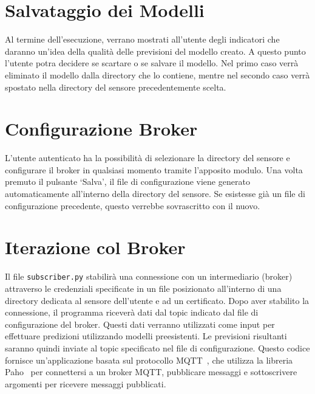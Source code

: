 \documentclass{rapportECL}
\begin{document}
\section{Salvataggio dei Modelli}
Al termine dell'esecuzione, verrano mostrati all'utente degli indicatori che daranno un'idea della qualità delle previsioni del modello creato.
A questo punto l'utente potra decidere se scartare o se salvare il modello. Nel primo caso verrà eliminato il modello dalla directory che lo contiene, mentre nel 
secondo caso verrà spostato nella directory del sensore precedentemente scelta.

\section{Configurazione Broker}
L'utente autenticato ha la possibilità di selezionare la directory del sensore e configurare il broker in qualsiasi momento tramite l'apposito modulo. 
Una volta premuto il pulsante `Salva', il file di configurazione viene generato automaticamente all'interno della directory del sensore. 
Se esistesse già un file di configurazione precedente, questo verrebbe sovrascritto con il nuovo.

\section{Iterazione col Broker}
Il file \texttt{subscriber.py} stabilirà una connessione con un intermediario (broker) attraverso le credenziali specificate in 
un file posizionato all'interno di una directory dedicata al sensore dell'utente e ad un certificato. Dopo aver stabilito la connessione, il programma riceverà 
dati dal topic indicato dal file di configurazione del broker. Questi dati verranno utilizzati come input per effettuare predizioni utilizzando modelli preesistenti. 
Le previsioni risultanti saranno quindi inviate al topic specificato nel file di configurazione. 
Questo codice fornisce un'applicazione basata sul protocollo MQTT~\cite{mqtt}, che utilizza la libreria Paho~\cite{paho} per connettersi 
a un broker MQTT, pubblicare messaggi e sottoscrivere argomenti per ricevere messaggi pubblicati.




\end{document}
